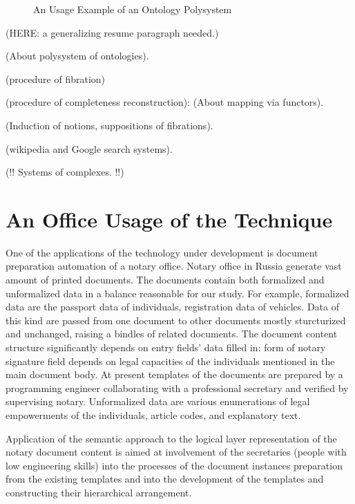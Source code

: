 \documentclass[utf8]{../IncArticle}
\begin{document}
\begin{figure}
\centering\sf
\def\svgwidth{0.9\linewidth}

\caption{An  Usage Example of an Ontology Polysystem}
\label{OPSA}
\end{figure}



(HERE: a generalizing resume paragraph needed.)

(About polysystem of ontologies).

(procedure of fibration)

(procedure of completeness reconstruction): (About mapping via functors).

(Induction of notions, suppositions of fibrations).

(wikipedia and Google search systems).

(!! Systems of complexes. !!)

\section{An Office Usage of the Technique}

One of the applications of the technology under development is document preparation automation of a notary office. Notary office in Russia generate vast amount of printed documents. The documents contain both formalized and unformalized data in a balance reasonable for our study. For example, formalized data are the passport data of individuals, registration data of vehicles. Data of this kind are passed from one document to other documents mostly sturcturized and unchanged, raising a bindles of related documents. The document content structure significantly depends on entry fields’ data filled in: form of notary signature field depends on legal capacities of the individuals mentioned in the main document body. At present templates of the documents are prepared by a programming engineer collaborating with a professional secretary and verified by supervising notary. Unformalized data are various enumerations of legal empowerments of the individuals, article codes, and explanatory text.

Application of the semantic approach to the logical layer representation of the notary document content is aimed at involvement of the secretaries (people with low engineering skills) into the processes of the document instances preparation from the existing templates and into the development of the templates and constructing their hierarchical arrangement.
\end{document}
